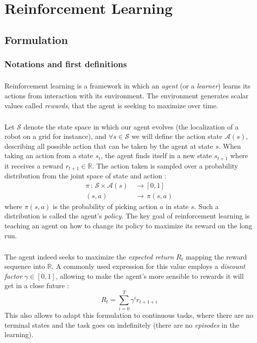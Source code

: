 \documentclass[a4paper]{report}
\begin{document}
	\chapter{Reinforcement Learning}
	{
		\section{Formulation}
		{
			\subsection{Notations and first definitions}
			{
				\paragraph{} Reinforcement learning is a framework in which an \emph{agent} (or a \emph{learner}) learns its actions from interaction with its environment. The environment generates scalar values called \emph{rewards}, that the agent is seeking to maximize over time. 
			
				\paragraph{} Let $\mathcal{S}$ denote the state space in which our agent evolves (the localization of a robot on a grid for instance), and $\forall{s}\in\mathcal{S}$ we will define the action state $\mathcal{A}(s)$, describing all possible action that can be taken by the agent at state $s$. When taking an action from a state $s_t$, the agent finds itself in a new state $s_{t+1}$ where it receives a reward $r_{t+1}\in\mathbb{R}$. The action taken is sampled over a probability distribution from the joint space of state and action : 
				\begin{equation}
					\begin{aligned}
						\pi \, : \, \mathcal{S}\times\mathcal{A}(s) \, &\to [0,1]\\
							 (s,a) \, &\to \,  \pi(s,a)
					\end{aligned}
				\end{equation}	
				where $\pi(s,a)$ is the probability of picking action $a$ in state $s$. Such a distribution is called the agent's \emph{policy}. The key goal of reinforcement learning is teaching an agent on how to change its policy to maximize its reward on the long run. 
				
				\paragraph{} The agent indeed seeks to maximize the \emph{expected return} $R_t$ mapping the reward sequence into $\mathbb{R}$. A commonly used expression for this value employs a \emph{discount factor} $\gamma \in [0,1]$, allowing to make the agent's more sensible to rewards it will get in a close future : 
				\begin{equation}
					R_t = \sum_{i=0}^T \gamma^i r_{t+1+i}
				\end{equation}
				This also allows to adapt this formulation to continuous tasks, where there are no terminal states and the task goes on indefinitely (there are no \emph{episodes} in the learning). 
				
}}}
\end{document}

